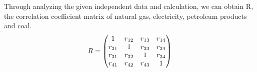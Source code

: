 \documentclass[a4paper,11pt]{article}
\begin{document}





\par Through analyzing the given independent data and calculation, we can obtain R, the correlation coefficient matrix of natural gas, electricity, petroleum products and coal.
\begin{equation}
    \centering
R=\begin{pmatrix} 1 & r_{12} & r_{13} & r_{14} \\ r_{21} & 1 & r_{23} & r_{24} \\ r_{31} & r_{32} & 1 & r_{34} \\ r_{41} & r_{42} & r_{43} & 1\end{pmatrix}
\end{equation}
\end{document}
